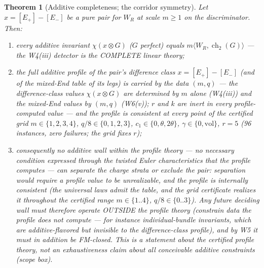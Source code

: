 \documentclass[11pt]{article}
\newtheorem{theorem}{Theorem}[section]
\theoremstyle{definition}
\newcommand{\ch}{\operatorname{ch}}
\newcommand{\vol}{\mathrm{vol}}
\begin{document}
\begin{theorem}[Additive completeness; the corridor symmetry]\label{thm:completeness}
Let $x=[E_+]-[E_-]$ be a pure pair for $W_R$ at scale $m\ge 1$ on the
discriminator. Then:
\begin{enumerate}
\item[(i)] every additive invariant $\chi(x\otimes G)$ ($G$ perfect) equals
$m\langle W_R,\ch_2(G)\rangle$ --- the W4(iii) detector is the COMPLETE linear
theory;
\item[(ii)] the full additive profile of the pair's difference class
$x=[E_+]-[E_-]$ (and of the mixed-End table of its legs) is carried by the
data $(m,q)$ --- the difference-class values $\chi(x\otimes G)$ are
determined by $m$ alone (W4(iii)) and the mixed-End values by $(m,q)$
(W6(v)); $r$ and $k$ are inert in every profile-computed value --- and the
profile is consistent at every point of the certified grid
$m\in\{1,2,3,4\}$, $q/8\in\{0,1,2,3\}$,
$c_1\in\{0,\theta,2\theta\}$, $\gamma\in\{0,\vol\}$, $r=5$
(96 instances, zero failures; the grid fixes $r$);
\item[(iii)] consequently no additive wall \emph{within the profile theory}
--- no necessary condition expressed through the twisted Euler
characteristics that the profile computes --- can separate the charge
strata or exclude the pair: separation would require a profile value to be
unrealizable, and the profile is internally consistent (the universal laws
admit the table, and the grid certificate realizes it throughout the
certified range $m\in\{1..4\}$, $q/8\in\{0..3\}$). Any future deciding
wall must therefore operate OUTSIDE the profile theory (constrain data the
profile does not compute --- for instance individual-bundle invariants,
which are additive-flavored but invisible to the difference-class profile),
and by W5 it must in addition be FM-closed. This is a statement about the certified profile
theory, not an exhaustiveness claim about all conceivable additive
constraints (scope box).
\end{enumerate}
\end{theorem}
\end{document}
